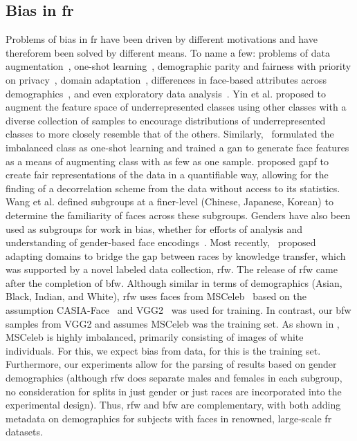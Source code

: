 \subsection{Bias in \gls{fr}}
Problems of bias in \gls{fr} have been driven by different motivations and have thereforem been solved by different means. To name a few: problems of data augmentation~\cite{yin2019feature}, one-shot learning~\cite{ding2018one}, demographic parity and fairness with priority on privacy~\cite{huang2018generative}, domain adaptation~\cite{wang2018racial}, differences in face-based attributes across demographics~\cite{wang2018they}, and even exploratory data analysis~\cite{muthukumar2019}. Yin et al. \cite{yin2019feature} proposed to augment the feature space of underrepresented classes using other classes with a diverse collection of samples to encourage distributions of underrepresented classes to more closely resemble that of the others. Similarly,~\cite{ding2018one} formulated the imbalanced class as one-shot learning and trained a \gls{gan} to generate face features as a means of augmenting class with as few as one sample. \cite{huang2018generative} proposed \gls{gapf} to create fair representations of the data in a quantifiable way, allowing for the finding of a decorrelation scheme from the data without access to its statistics. Wang et al. \cite{wang2018they} defined subgroups at a finer-level (\ie Chinese, Japanese, Korean) to determine the familiarity of faces across these subgroups. Genders have also been used as subgroups for work in bias, whether for efforts of analysis and understanding of gender-based face encodings~\cite{muthukumar2019}. Most recently,~\cite{wang2018racial} proposed adapting domains to bridge the gap between races by knowledge transfer, which was supported by a novel labeled data collection, \gls{rfw}. The release of \gls{rfw} came after the completion of \gls{bfw}. Although similar in terms of demographics (\ie Asian, Black, Indian, and White), \gls{rfw} uses faces from MSCeleb~\cite{guo2016ms} based on the assumption CASIA-Face~\cite{yi2014learning} and VGG2~\cite{Cao18} was used for training. In contrast, our \gls{bfw} samples from VGG2 and assumes MSCeleb was the training set. As shown in \cite{wang2018racial}, MSCeleb is highly imbalanced, primarily consisting of images of white individuals. For this, we expect bias from data, for this is the training set. Furthermore, our experiments allow for the parsing of results based on gender demographics (\ie although \gls{rfw} does separate males and females in each subgroup, no consideration for splits in just gender or just races are incorporated into the experimental design). Thus, \gls{rfw} and \gls{bfw} are complementary, with both adding metadata on demographics for subjects with faces in renowned, large-scale \gls{fr} datasets.

